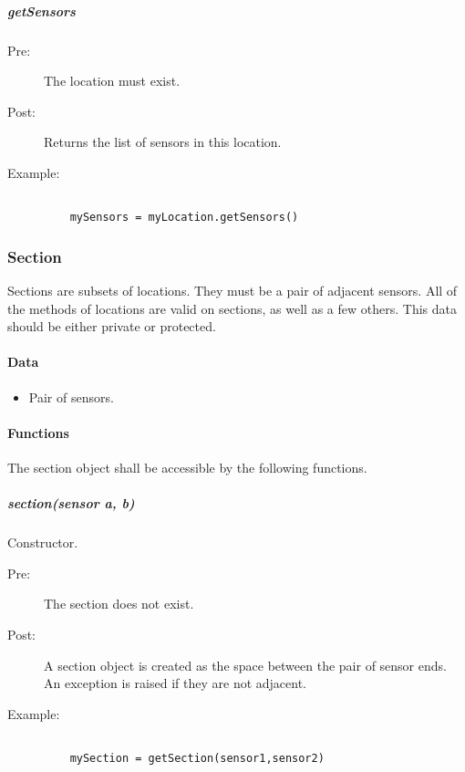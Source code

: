 \documentclass[a4paper,11pt,notitlepage]{article}
\begin{document}
\subparagraph{getSensors}
\begin{description}
\item[\hspace{1cm}Pre:] The location must exist. 
\item[\hspace{1cm}Post:] Returns the list of sensors in this location.
\item[\hspace{1cm}Example:]
\begin{verbatim}

    mySensors = myLocation.getSensors()   
\end{verbatim}
\end{description}

\subsubsection{Section}
Sections are subsets of locations. They must be a pair of adjacent sensors. All of the methods of locations are valid on sections, as well as a few others. This data should be either private or protected. 
\paragraph{Data}
\begin{itemize}
\item Pair of sensors.
\end{itemize}
\paragraph{Functions}
The section object shall be accessible by the following functions.
\subparagraph{section(sensor a, b)} Constructor.
\begin{description}
\item[\hspace{1cm}Pre:] The section does not exist.
\item[\hspace{1cm}Post:] A section object is created as the space between the pair of sensor ends. An exception is raised if they are not adjacent.
\item[\hspace{1cm}Example:]
\begin{verbatim}

    mySection = getSection(sensor1,sensor2)
\end{verbatim}
\end{description}
\end{document}
